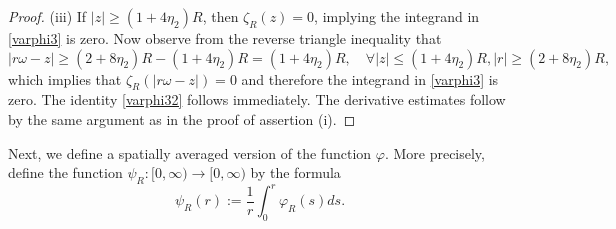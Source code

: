 \documentclass[reqno,11pt]{amsart}
\theoremstyle{plain}
\theoremstyle{definition}
\numberwithin{equation}{section}
\numberwithin{theorem}{section}
\def\geq{\geqslant}
\def\leq{\leqslant}
\begin{document}
\begin{proof}
 (iii) If $|z| \geq(1+4 \eta_{2}) R$, then $\zeta_{R}(z)=0$, implying the integrand in \eqref{varphi3} is zero. Now observe from the reverse triangle inequality that
\begin{equation*}
|r \omega-z| \geq(2+8 \eta_{2}) R-(1+4 \eta_{2}) R=(1+4 \eta_{2}) R, \quad \forall|z| \leq(1+4 \eta_{2}) R,|r| \geq(2+8 \eta_{2}) R,
\end{equation*}
which implies that $\zeta_{R}(|r \omega-z|)=0$ and therefore the integrand in \eqref{varphi3} is zero. The identity \eqref{varphi32} follows immediately. The derivative estimates follow by the same argument as in the proof of assertion (i).
\end{proof}


Next, we define a  spatially averaged version of the function $\varphi$. More precisely, define the function $\psi_{R}:[0, \infty) \rightarrow[0, \infty)$ by the formula
\begin{equation}\label{equ:psiRdef}
\psi_{R}( r):=\frac{1}{r} \int_{0}^{r} \varphi_{R}\left( s\right) d s.
\end{equation}
\end{document}
